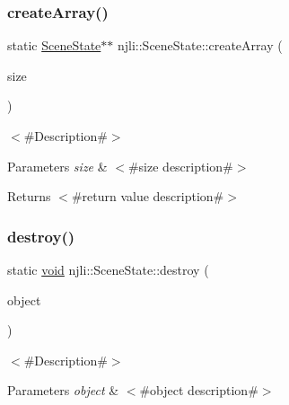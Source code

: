 \subsubsection{\texorpdfstring{create\+Array()}{createArray()}}
{\footnotesize\ttfamily static \mbox{\hyperlink{classnjli_1_1_scene_state}{Scene\+State}}$\ast$$\ast$ njli\+::\+Scene\+State\+::create\+Array (\begin{DoxyParamCaption}\item[{const \mbox{\hyperlink{_util_8h_a10e94b422ef0c20dcdec20d31a1f5049}{u32}}}]{size }\end{DoxyParamCaption})\hspace{0.3cm}{\ttfamily [static]}}

$<$\#\+Description\#$>$


\begin{DoxyParams}{Parameters}
{\em size} & $<$\#size description\#$>$\\
\hline
\end{DoxyParams}
\begin{DoxyReturn}{Returns}
$<$\#return value description\#$>$ 
\end{DoxyReturn}
\mbox{\label{classnjli_1_1_scene_state_a8d4e7fde5ccb368eba840abd98baa3ee}} 
\subsubsection{\texorpdfstring{destroy()}{destroy()}}
{\footnotesize\ttfamily static \mbox{\hyperlink{_thread_8h_af1e856da2e658414cb2456cb6f7ebc66}{void}} njli\+::\+Scene\+State\+::destroy (\begin{DoxyParamCaption}\item[{\mbox{\hyperlink{classnjli_1_1_scene_state}{Scene\+State}} $\ast$}]{object }\end{DoxyParamCaption})\hspace{0.3cm}{\ttfamily [static]}}

$<$\#\+Description\#$>$


\begin{DoxyParams}{Parameters}
{\em object} & $<$\#object description\#$>$ \\
\hline
\end{DoxyParams}
\mbox{\label{classnjli_1_1_scene_state_a3e2d4d122ab498db3a958e2fa4ccf7c1}} 
